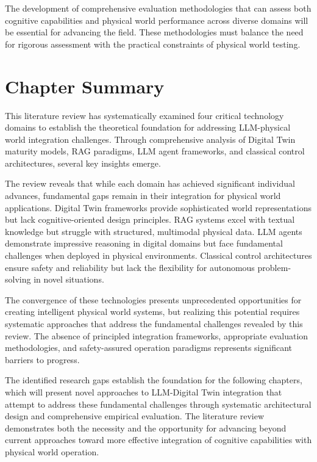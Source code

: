 The development of comprehensive evaluation methodologies that can assess both cognitive capabilities and physical world performance across diverse domains will be essential for advancing the field. These methodologies must balance the need for rigorous assessment with the practical constraints of physical world testing.

\section{Chapter Summary}

This literature review has systematically examined four critical technology domains to establish the theoretical foundation for addressing LLM-physical world integration challenges. Through comprehensive analysis of Digital Twin maturity models, RAG paradigms, LLM agent frameworks, and classical control architectures, several key insights emerge.

The review reveals that while each domain has achieved significant individual advances, fundamental gaps remain in their integration for physical world applications. Digital Twin frameworks provide sophisticated world representations but lack cognitive-oriented design principles. RAG systems excel with textual knowledge but struggle with structured, multimodal physical data. LLM agents demonstrate impressive reasoning in digital domains but face fundamental challenges when deployed in physical environments. Classical control architectures ensure safety and reliability but lack the flexibility for autonomous problem-solving in novel situations.

The convergence of these technologies presents unprecedented opportunities for creating intelligent physical world systems, but realizing this potential requires systematic approaches that address the fundamental challenges revealed by this review. The absence of principled integration frameworks, appropriate evaluation methodologies, and safety-assured operation paradigms represents significant barriers to progress.

The identified research gaps establish the foundation for the following chapters, which will present novel approaches to LLM-Digital Twin integration that attempt to address these fundamental challenges through systematic architectural design and comprehensive empirical evaluation. The literature review demonstrates both the necessity and the opportunity for advancing beyond current approaches toward more effective integration of cognitive capabilities with physical world operation.